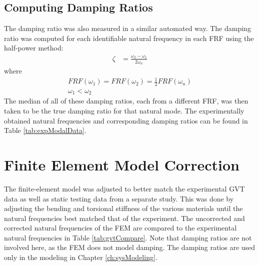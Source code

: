\subsection{Computing Damping Ratios}

The damping ratio was also measured in a similar automated way. The damping ratio was computed for each identifiable natural frequency in each FRF using the half-power method:
\begin{align}
	\zeta &= \frac{\omega_2 - \omega_1}{2\omega_n}
\end{align}
where
\begin{equation}
\begin{gathered}
	FRF(\omega_1) = FRF(\omega_2) = \frac{1}{2} FRF(\omega_n) \\
	\omega_1 < \omega_2
\end{gathered}
\end{equation}
The median of all of these damping ratios, each from a different FRF, was then taken to be the true damping ratio for that natural mode. The experimentally obtained natural frequencies and corresponding damping ratios can be found in Table \ref{tab:expModalData}.

\section{Finite Element Model Correction} %

The finite-element model was adjusted to better match the experimental GVT data as well as static testing data from a separate study. This was done by adjusting the bending and torsional stiffness of the various materials until the natural frequencies best matched that of the experiment. The uncorrected and corrected natural frequencies of the FEM are compared to the experimental natural frequencies in Table \ref{tab:gvtCompare}. Note that damping ratios are not involved here, as the FEM does not model damping. The damping ratios are used only in the modeling in Chapter \ref{ch:sysModeling}.

